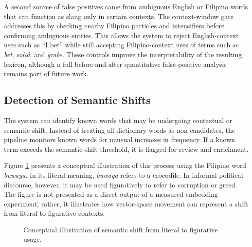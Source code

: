 A second source of false positives came from ambiguous English or Filipino words that can function as slang only in certain contexts. The context-window gate addresses this by checking nearby Filipino particles and intensifiers before confirming ambiguous entries. This allows the system to reject English-context uses such as ``I bet'' while still accepting Filipino-context uses of terms such as \textit{bet}, \textit{solid}, and \textit{grabe}. These controls improve the interpretability of the resulting lexicon, although a full before-and-after quantitative false-positive analysis remains part of future work.

\subsection{Detection of Semantic Shifts}

The system can identify known words that may be undergoing contextual or semantic shift. Instead of treating all dictionary words as non-candidates, the pipeline monitors known words for unusual increases in frequency. If a known term exceeds the semantic-shift threshold, it is flagged for review and enrichment.

Figure \ref{fig:semantic_shift} presents a conceptual illustration of this process using the Filipino word \textit{buwaya}. In its literal meaning, \textit{buwaya} refers to a crocodile. In informal political discourse, however, it may be used figuratively to refer to corruption or greed. The figure is not presented as a direct output of a measured embedding experiment; rather, it illustrates how vector-space movement can represent a shift from literal to figurative contexts.

\begin{figure}[H]
\centering
{}
\caption{Conceptual illustration of semantic shift from literal to figurative usage.}
\label{fig:semantic_shift}
\end{figure}

